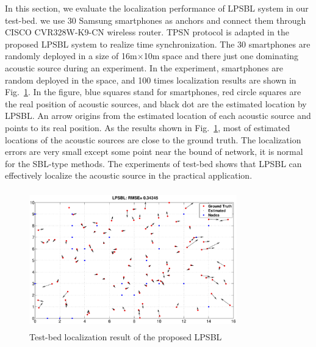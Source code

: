 In this section, we evaluate the localization performance of LPSBL system in our test-bed.
we use 30 Samsung smartphones as anchors and connect them through CISCO CVR328W-K9-CN wireless router. 
TPSN protocol is adapted in the proposed LPSBL system to realize time synchronization.
The 30 smartphones are randomly deployed in a size of 16m$\times$10m space and there just one dominating acoustic source during an experiment.
In the experiment, smartphones are random deployed in the space, and 100 times localization results are shown in Fig.~\ref{emulation}. 
In the figure, blue squares stand for smartphones, red circle squares are the real position of acoustic sources, and black dot are the estimated location by LPSBL. 
An arrow origins from the estimated location of each acoustic source and points to its real position. 
As the results shown in Fig.~\ref{emulation}, most of estimated locations of the acoustic sources are close to the ground truth.
The localization errors are very small except some point near the bound of network, it is normal for the SBL-type methods.
The experiments of test-bed shows that LPSBL can effectively localize the acoustic source in the practical application.
  \begin{figure}[htb]
            \includegraphics[height=6cm,width=9.0cm]{image/emulation.eps}
			 \vspace{-5mm}
             \caption{Test-bed localization result of the proposed LPSBL}
             \vspace{-7mm}
             \label{emulation}
        \end{figure}
